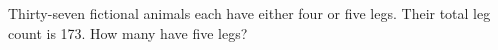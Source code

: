 Thirty-seven fictional animals each have either four or five legs. Their total leg count is 173. How many have five legs?
